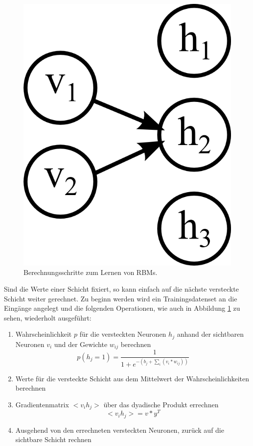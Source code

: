 \begin{figure}
{\begin{minipage}{0.33\textwidth}
	\includegraphics[scale=1]{images/rbm-step3.png}\end{minipage}}
\caption{Berechnungsschritte zum Lernen von RBMs.}
\label{fig:rbm-steps}
\end{figure}

Sind die Werte einer Schicht fixiert, so kann einfach auf die nächste versteckte Schicht weiter gerechnet. Zu beginn werden wird ein Trainingsdatenset an die Eingänge angelegt und die folgenden Operationen, wie auch in Abbildung \ref{fig:rbm-steps} zu sehen, wiederholt ausgeführt:

\begin{enumerate}
\item Wahrscheinlichkeit $p$ für die versteckten Neuronen $h_j$ anhand der sichtbaren Neuronen $v_i$ und der Gewichte $w_{ij}$ berechnen $$p(h_j=1) = \frac{1}{1+e^{-(b_j+\sum_{i}(v_i*w_{ij}))}}$$
\item Werte für die versteckte Schicht aus dem Mittelwert der Wahrscheinlichkeiten berechnen
\item Gradientenmatrix $<v_ih_j>$ über das dyadische Produkt errechnen $$<v_ih_j> = v*y^T$$
\item Ausgehend von den errechneten versteckten Neuronen, zurück auf die sichtbare Schicht rechnen
\end{enumerate}

